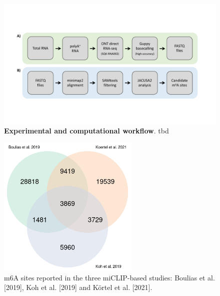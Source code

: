 \documentclass[times, 11pt, a4paper]{article}
\begin{document}
\begin{figure}[h!]
    \includegraphics[width = 1\textwidth]{Figure3.pdf}
  \caption{\textbf{Experimental and computational workflow}. tbd}
  \label{fig:workflow}
      \end{figure}
\newpage

\begin{figure}[h!]
	\includegraphics[width = 0.6\textwidth]{img/venn_diagramm.png}
	\caption{m6A sites reported in the three miCLIP-based studies: Boulias et al. [2019], Koh et al. [2019] and Körtel et al. [2021].}
	\label{fig:miclip_sites}
\end{figure}
\newpage
\end{document}
